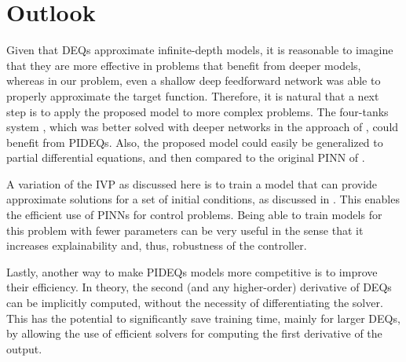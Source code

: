 
\section{Outlook}

Given that \gls{DEQ}s approximate infinite-depth models, it is reasonable to imagine that they are more effective in problems that benefit from deeper models, whereas in our problem, even a shallow deep feedforward network was able to properly approximate the target function.
Therefore, it is natural that a next step is to apply the proposed model to more complex problems.
The four-tanks system \cite{johansson_quadruple-tank_2000,gatzke_model_2000}, which was better solved with deeper networks in the approach of \textcite{Antonelo2021}, could benefit from \glspl{PIDEQ}.
Also, the proposed model could easily be generalized to partial differential equations, and then compared to the original \gls{PINN} of \textcite{Raissi2019}.

A variation of the \gls{IVP} as discussed here is to train a model that can provide approximate solutions for a set of initial conditions, as discussed in \textcite{Antonelo2021,Arnold2021}.
This enables the efficient use of \glspl{PINN} for control problems.
Being able to train models for this problem with fewer parameters can be very useful in the sense that it increases explainability and, thus, robustness of the controller.

Lastly, another way to make \glspl{PIDEQ} models more competitive is to improve their efficiency.
In theory, the second (and any higher-order) derivative of \glspl{DEQ} can be implicitly computed, without the necessity of differentiating the solver.
This has the potential to significantly save training time, mainly for larger \glspl{DEQ}, by allowing the use of efficient solvers for computing the first derivative of the output.

